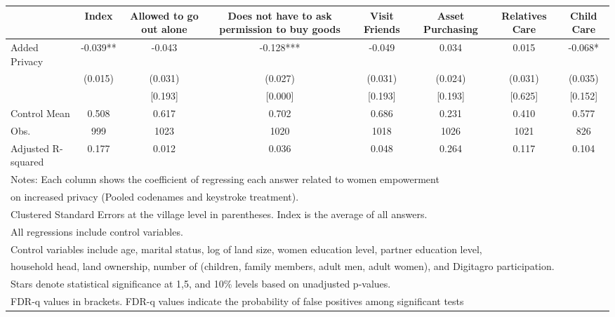 {
\def\sym#1{\ifmmode^{#1}\else\(^{#1}\)\fi}
\begin{tabular}{l*{7}{c}}
\toprule
                &\multicolumn{1}{c}{Index}&\multicolumn{1}{c}{Allowed to go out alone}&\multicolumn{1}{c}{Does not have to ask permission to buy goods}&\multicolumn{1}{c}{Visit Friends}&\multicolumn{1}{c}{Asset Purchasing}&\multicolumn{1}{c}{Relatives Care}&\multicolumn{1}{c}{Child Care}\\
\midrule
Added Privacy   &   -0.039** &   -0.043   &   -0.128***&   -0.049   &    0.034   &    0.015   &   -0.068*  \\
                &  (0.015)   &  (0.031)   &  (0.027)   &  (0.031)   &  (0.024)   &  (0.031)   &  (0.035)   \\
                &            &  [0.193]   &  [0.000]   &  [0.193]   &  [0.193]   &  [0.625]   &  [0.152]   \\
\midrule
Control Mean    &    0.508   &    0.617   &    0.702   &    0.686   &    0.231   &    0.410   &    0.577   \\
Obs.            &      999   &     1023   &     1020   &     1018   &     1026   &     1021   &      826   \\
Adjusted R-squared&    0.177   &    0.012   &    0.036   &    0.048   &    0.264   &    0.117   &    0.104   \\
\bottomrule
\multicolumn{8}{l}{\footnotesize Notes: Each column shows the coefficient of regressing each answer related to women empowerment}\\
\multicolumn{8}{l}{\footnotesize on increased privacy (Pooled codenames and keystroke treatment).}\\
\multicolumn{8}{l}{\footnotesize Clustered Standard Errors at the village level in parentheses. Index is the average of all answers.}\\
\multicolumn{8}{l}{\footnotesize All regressions include control variables.}\\
\multicolumn{8}{l}{\footnotesize Control variables include age, marital status, log of land size, women education level, partner education level,}\\
\multicolumn{8}{l}{\footnotesize household head, land ownership, number of (children, family members, adult men, adult women), and Digitagro participation.}\\
\multicolumn{8}{l}{\footnotesize Stars denote statistical significance at 1,5, and 10\% levels based on unadjusted p-values.}\\
\multicolumn{8}{l}{\footnotesize FDR-q values in brackets. FDR-q values indicate the probability of false positives among significant tests}\\
\end{tabular}
}
